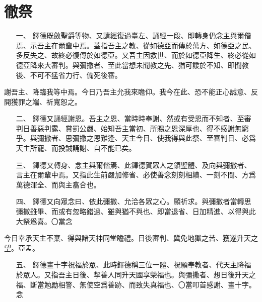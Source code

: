 \section{徹祭}
\begin{enumerate}
    \item[一、]{\small 鐸德既斂聖爵等物、又請經復過臺左、誦經一段、即轉身仍念主與爾偕焉、示吾主在爾輩中焉。蓋指吾主之教、從如德亞而傳於萬方、如德亞之民、多反失之、故終必復傳於如德亞。又吾主因救世、而於如德亞降生、終必從如德亞降來大審判。與彌撒者、至此當想未聞教之先、猶可諉於不知、即聞教後、不可不猛省力行、備死後審。}
\end{enumerate}
謝吾主、降臨我等中焉。今日乃吾主允我來瞻仰。我今在此、恐不能正心誠意、反開獲罪之端、祈寬恕之。
\begin{enumerate}
    \item[二、]{\small 鐸德又誦經謝恩。吾主之恩、當時時奉謝、然或有受恩而不知者、至審判日善惡判露、賞罰公嚴、始知吾主當初、所賜之恩深厚也、得不感謝無窮乎。與彌撒者、思彌撒之恩難逢、天主今日、使我得與此祭、至審判日、必爲天主所寵、而投誠誦謝、自不能已矣。}
    \item[三、]{\small 鐸德又轉身、念主與爾偕焉、此鐸德賀眾人之領聖體、及向與彌撒者、言主在爾輩中焉。又指此生前嚴加修省、必使善念刻刻相續、一刻不間、方爲萬德渾全、而與主翕合也。}
    \item[四、]{\small 鐸德又向眾念曰、依此彌撒、允洽各眾之心。願祈求。與彌撒者當轉思彌撒雖畢、而或有忽略錯過、雖與猶不與也、即當退省、日加精進、以得與此大祭爲喜。〇當念}
\end{enumerate}
今日幸承天主不棄、得與諸天神同堂瞻禮。日後審判、冀免地獄之苦、獲遂升天之望。{\cspace}亞孟。
\begin{enumerate}
    \item[五、]{\small 鐸德畫十字祝福於眾、此時鐸德稱三位一體、祝願奉教者、代天主降福於眾人。又指吾主日後、挈善人同升天國享榮福也。與彌撒者、想日後升天之福、斷當勉勵相警、無使空爲善跡、而致失真福也、〇當叩首感謝、畫十字。念}
\end{enumerate}
